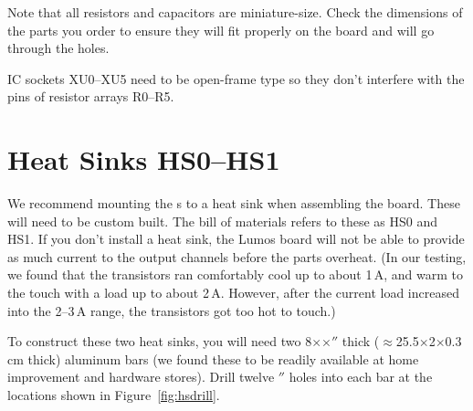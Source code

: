 \documentclass[letterpaper,twoside,onecolumn,openright,final]{memoir}
\begin{document}
Note that all resistors and capacitors are miniature-size.  Check the dimensions of the parts
you order to ensure they will fit properly on the board and will go through the holes.

IC sockets XU0--XU5 need to be open-frame type so they don't interfere with the pins of
resistor arrays R0--R5.

\section{Heat Sinks HS0--HS1}
We recommend mounting the s to a heat sink when assembling the board.  These
will need to be custom built.  The bill of materials refers to these as HS0 and HS1.  If you
don't install a heat sink, the Lumos board will not be able to provide as much current to
the output channels before the  parts overheat.  (In our testing, we found that
the transistors ran comfortably cool up to about 1\,A, and warm to the touch with
a load up to about 2\,A.  However, after the current load increased into the 2--3\,A range, 
the transistors got too hot to touch.)


To construct these two heat sinks, you will need two 
8$\times$$\times$$''$ thick ($\approx$25.5$\times$2$\times$0.3\,cm thick) 
aluminum bars (we found these to be readily available at home improvement
and hardware stores).  Drill twelve $''$ holes into each bar at the locations shown in 
Figure~\ref{fig:hsdrill}.
\end{document}
